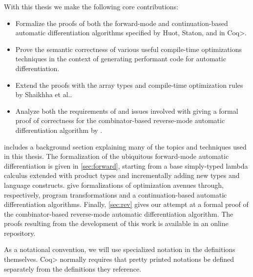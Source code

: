 With this thesis we make the following core contributions:
\begin{itemize}
  \item Formalize the proofs of both the forward-mode and continuation-based automatic differentiation algorithms specified by Huot, Staton, and \Vakar{} \cite{huot2020correctness} in \<Coq>.
  \item Prove the semantic correctness of various useful compile-time optimizations techniques in the context of generating performant code for automatic differentiation.
  \item Extend the proofs with the array types and compile-time optimization rules by Shaikhha et al.\cite{Shaikha2019}.
  \item Analyze both the requirements of and issues involved with giving a formal proof of correctness for the combinator-based reverse-mode automatic differentiation algorithm by \Vakar{}\cite{vkr2020reverse}.
\end{itemize}

 includes a background section explaining many of the topics and techniques used in this thesis. The formalization of the ubiquitous forward-mode automatic differentiation is given in \cref{sec:forward}, starting from a base simply-typed lambda calculus extended with product types and incrementally adding new types and language constructs.  give formalizations of optimization avenues through, respectively, program transformations and a continuation-based automatic differentiation algorithms.
Finally, \cref{sec:rev} gives our attempt at a formal proof of the combinator-based reverse-mode automatic differentiation algorithm.
The proofs resulting from the development of this work is available in an online repository\cite{curtis_chin_jen_sem_2020_4022908}.

As a notational convention, we will use specialized notation in the definitions themselves.
\<Coq> normally requires that pretty printed notations be defined separately from the definitions they reference.
